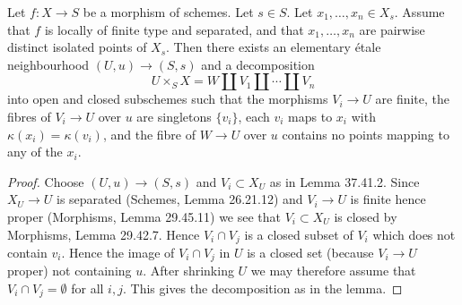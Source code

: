 
\begin{lemma}
Let $f:X\to S$ be a morphism of schemes. Let $s\in S$. Let $x_1,\ldots,x_n\in X_s$. Assume that $f$ is locally of finite type and separated, and that $x_1,\ldots,x_n$ are pairwise distinct isolated points of $X_s$. Then there exists an elementary étale neighbourhood $(U,u)\to(S,s)$ and a decomposition
\[
U\times_S X=W\amalg V_1\amalg\cdots\amalg V_n
\]
into open and closed subschemes such that the morphisms $V_i\to U$ are finite, the fibres of $V_i\to U$ over $u$ are singletons $\{v_i\}$, each $v_i$ maps to $x_i$ with $\kappa(x_i)=\kappa(v_i)$, and the fibre of $W\to U$ over $u$ contains no points mapping to any of the $x_i$.
\end{lemma}
\begin{proof}
Choose $(U,u)\to(S,s)$ and $V_i\subset X_U$ as in Lemma 37.41.2. Since $X_U\to U$ is separated (Schemes, Lemma 26.21.12) and $V_i\to U$ is finite hence proper (Morphisms, Lemma 29.45.11) we see that $V_i\subset X_U$ is closed by Morphisms, Lemma 29.42.7. Hence $V_i\cap V_j$ is a closed subset of $V_i$ which does not contain $v_i$. Hence the image of $V_i\cap V_j$ in $U$ is a closed set (because $V_i\to U$ proper) not containing $u$. After shrinking $U$ we may therefore assume that $V_i\cap V_j=\emptyset$ for all $i,j$. This gives the decomposition as in the lemma.
\end{proof}

